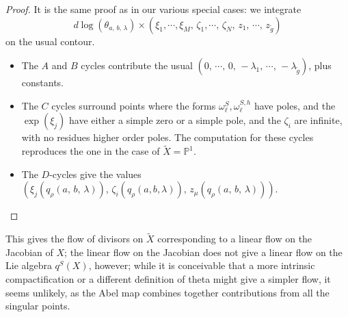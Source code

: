 \documentclass[12pt,reqno]{amsart}
\numberwithin{equation}{section}
\theoremstyle{definition}
\theoremstyle{remark}
\def\bP{{\mathbb {P}}}
\begin{document}
\begin{proof} It is the same proof as in our various special cases: we integrate 
$$   d\log (\theta_{a,\,b,\, \lambda})\times(\xi_1,\cdots, \xi_M,\, \zeta_1,\cdots,\, \zeta_N,\,
z_1,\,\cdots ,\, z_{\widetilde g})$$
on the usual contour. 
\begin{itemize} 
\item The $A$ and $B$ cycles contribute the usual $(0,\, \cdots,\, 0,\, -\lambda_1,\,\cdots ,\, -\lambda_{\widetilde g})$, plus constants.
\item The $C$ cycles surround points where the forms $\omega^S_{\ell}, \omega_\ell^{S,h }$ have poles, and   the $\exp(\xi_j)$ have either a simple zero or a simple pole, and the $\zeta_i$ are infinite, with no residues higher order poles. The computation for these cycles reproduces the one in the case of $\widetilde X = \bP^1$. 
\item The $D$-cycles give the values $( \xi_j(q_\rho(a,\,b,\, \lambda)),\,\zeta_{i}(q_\rho(a, b, \lambda)),\, z_\mu(q_\rho(a,\,b,\, \lambda)))$. \end{itemize}

\end{proof}

This gives the flow of divisors on $\widetilde X$ corresponding to a linear flow on the Jacobian of $X$; the 
linear flow on the Jacobian does not give a linear flow on the Lie algebra $q^S(X)$, however; while it is 
conceivable that a more intrinsic compactification or a different definition of theta might give a simpler 
flow, it seems unlikely, as the Abel map combines together contributions from all the 
singular points.
\end{document}
